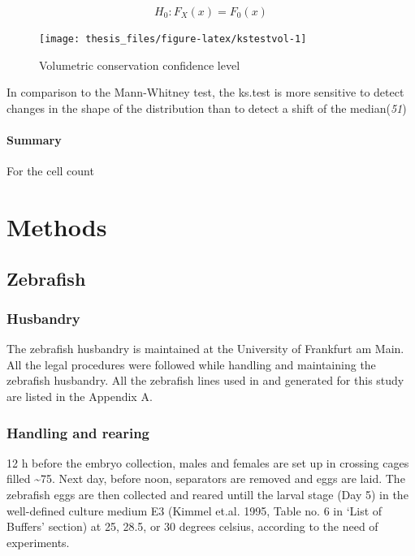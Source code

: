 \documentclass[11pt,singlespacinge,twoside]{reedthesis} %
\begin{document}
\[H_{0} : F_X(x)=F_0(x)\]


\begin{figure}

{\centering \texttt{[image: thesis\_files/figure-latex/kstestvol-1]} 

}

\caption{Volumetric conservation confidence level}\label{fig:kstestvol}
\end{figure}
\noindent In comparison to the Mann-Whitney test, the ks.test is more sensitive to detect changes in the shape of the distribution than to detect a shift of the median(\emph{51})

\hypertarget{summary-2}{%
\paragraph{Summary}\label{summary-2}}

For the cell count

\hypertarget{met}{%
\section{Methods}\label{met}}

\hypertarget{Zeb-met}{%
\subsection{Zebrafish}\label{Zeb-met}}

\hypertarget{husbandry}{%
\subsubsection{Husbandry}\label{husbandry}}

The zebrafish husbandry is maintained at the University of Frankfurt am Main. All the legal procedures were followed while handling and maintaining the zebrafish husbandry. All the zebrafish lines used in and generated for this study are listed in the Appendix A.

\hypertarget{handling-and-rearing}{%
\subsubsection{Handling and rearing}\label{handling-and-rearing}}

12 h before the embryo collection, males and females are set up in crossing cages filled \textasciitilde{}75. Next day, before noon, separators are removed and eggs are laid. The zebrafish eggs are then collected and reared untill the larval stage (Day 5) in the well-defined culture medium E3 (Kimmel et.al. 1995, Table no. 6 in `List of Buffers' section) at 25, 28.5, or 30 degrees celsius, according to the need of experiments.
\end{document}
